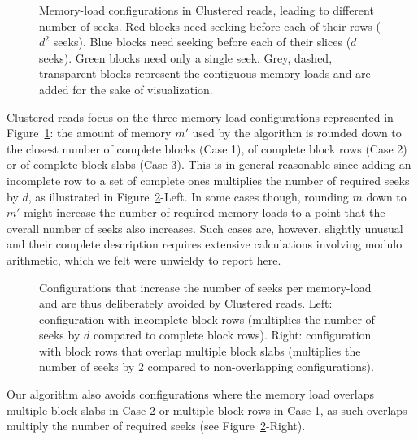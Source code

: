 \documentclass[10pt, conference, compsocconf]{IEEEtran}
\begin{document}
\begin{figure}
\centering
\def\svgwidth{0.3\columnwidth}

\def\svgwidth{0.3\columnwidth}

\def\svgwidth{0.3\columnwidth}

\caption{Memory-load configurations in Clustered reads, leading to
  different number of seeks. Red blocks need seeking before each of
  their rows ($d^2$ seeks). Blue blocks need seeking before each of
  their slices ($d$ seeks). Green blocks need only a single
  seek. Grey, dashed, transparent blocks represent the contiguous
  memory loads and are added for the sake of visualization.}
\label{fig:cluster-reads}
\end{figure}
Clustered reads focus on the three memory load
configurations represented in Figure~\ref{fig:cluster-reads}:
the amount of memory $m'$ used by the algorithm is rounded down to the
closest number of complete blocks (Case 1), of complete block rows (Case
2) or of complete block slabs (Case 3). This is in general reasonable
since adding an incomplete row to a set of complete ones multiplies
the number of required seeks by $d$, as illustrated in
Figure~\ref{fig:avoided-configurations}-Left. In some cases though,
rounding $m$ down to $m'$ might increase the number of required
memory loads to a point that the overall number of seeks also
increases. Such cases are, however, slightly unusual and their
complete description requires extensive calculations involving modulo
arithmetic, which we felt were unwieldy to report here.
\begin{figure}
  \centering
\def\svgwidth{0.3\columnwidth}

\quad \quad \quad
\def\svgwidth{0.3\columnwidth}

\caption{Configurations that increase the number of seeks per
  memory-load and are thus deliberately avoided by Clustered
  reads. Left: configuration with incomplete block rows (multiplies
  the number of seeks by $d$ compared to complete block rows). Right:
  configuration with block rows that overlap multiple block slabs
  (multiplies the number of seeks by $2$ compared to non-overlapping
  configurations).}
\label{fig:avoided-configurations}
\end{figure}

Our algorithm also avoids configurations where the memory load
overlaps multiple block slabs in Case 2 or multiple block rows in
Case 1, as such overlaps multiply the number of required seeks (see
Figure~\ref{fig:avoided-configurations}-Right).
\end{document}
